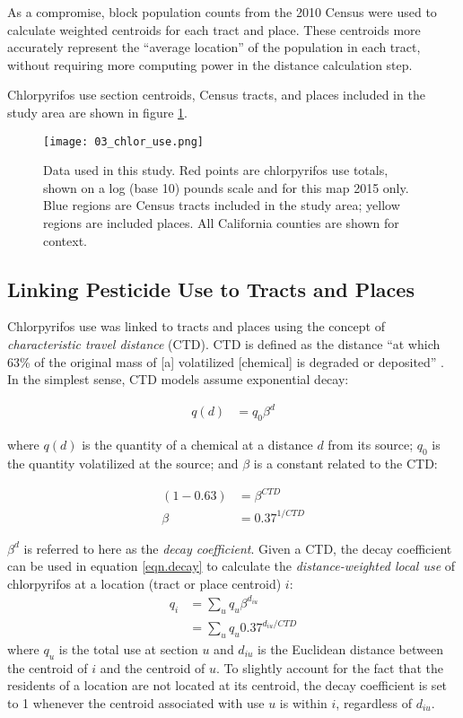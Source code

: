 \documentclass[ijerph,article,submit,oneauthor,pdftex]{Definitions/mdpi}
\begin{document}
As a compromise, block population counts from the 2010 Census were used to calculate weighted centroids for each tract and place. These centroids more accurately represent the ``average location'' of the population in each tract, without requiring more computing power in the distance calculation step.

Chlorpyrifos use section centroids, Census tracts, and places included in the study area are shown in figure \ref{fig.chlor_use}.

\begin{figure}
\centering
\texttt{[image: 03\_chlor\_use.png]}
\caption{Data used in this study. Red points are chlorpyrifos use totals, shown on a log (base 10) pounds scale and for this map 2015 only. Blue regions are Census tracts included in the study area; yellow regions are included places. All California counties are shown for context. \label{fig.chlor_use}}
\end{figure}

\hypertarget{linking-pesticide-use-to-tracts-and-places}{%
\subsection{Linking Pesticide Use to Tracts and Places}\label{linking-pesticide-use-to-tracts-and-places}}

Chlorpyrifos use was linked to tracts and places using the concept of \emph{characteristic travel distance} (CTD). CTD is defined as the distance ``at which 63\% of the original mass of {[}a{]} volatilized {[}chemical{]} is degraded or deposited'' \citep{MackayFateEnvironmentLongrange2014}. In the simplest sense, CTD models assume exponential decay:

\begin{align}
    q(d) &= q_0 \beta^d \label{eqn.decay}
\end{align}

where \(q(d)\) is the quantity of a chemical at a distance \(d\) from its source; \(q_0\) is the quantity volatilized at the source; and \(\beta\) is a constant related to the CTD:

\begin{align} 
    (1-0.63) &= \beta^{CTD}\\
    \beta &= 0.37^{1/CTD}
\end{align}

\(\beta^d\) is referred to here as the \emph{decay coefficient}. Given a CTD, the decay coefficient can be used in equation \ref{eqn.decay} to calculate the \emph{distance-weighted local use} of chlorpyrifos at a location (tract or place centroid) \(i\):\\
\begin{align}
    q_i &= \sum_u q_u \beta^{d_{iu}} \label{eqn.tot_pot_exp}\\
        &= \sum_u q_u 0.37^{d_{iu}/CTD}
\end{align}
where \(q_u\) is the total use at section \(u\) and \(d_{iu}\) is the Euclidean distance between the centroid of \(i\) and the centroid of \(u\). To slightly account for the fact that the residents of a location are not located at its centroid, the decay coefficient is set to 1 whenever the centroid associated with use \(u\) is within \(i\), regardless of \(d_{iu}\).
\end{document}
